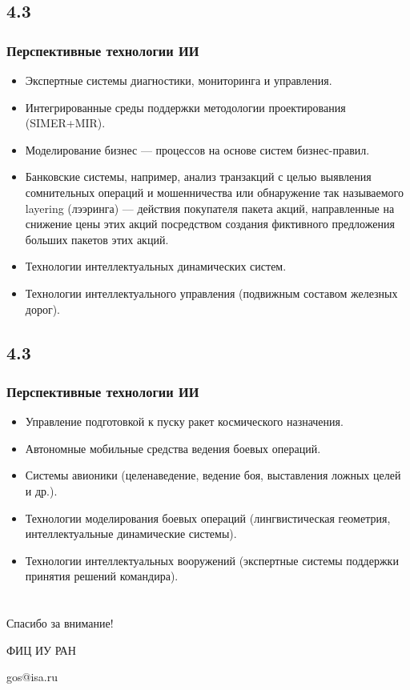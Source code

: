 \documentclass[default]{beamer}
\begin{document}
	\subsection{4.3}
	\begin{frame}
		\frametitle{Перспективные технологии ИИ}
		
		\begin{itemize}
			\item Экспертные системы диагностики, мониторинга и управления.
			\item Интегрированные среды поддержки методологии проектирования (SIMER+MIR).
			\item Моделирование бизнес --- процессов на основе систем бизнес-правил.
			\item Банковские системы, например,  анализ транзакций с целью выявления сомнительных операций и  мошенничества или обнаружение так называемого layering (лээринга) --- действия покупателя пакета акций, направленные на снижение цены этих акций посредством создания фиктивного предложения больших пакетов этих акций.
			\item Технологии интеллектуальных динамических систем.
			\item Технологии интеллектуального управления (подвижным составом железных дорог).
		\end{itemize}
		
	\end{frame}
	
	\subsection{4.3}
	\begin{frame}
		\frametitle{Перспективные технологии ИИ}
		
		\begin{itemize}
			\item Управление подготовкой к пуску ракет космического	назначения.
			\item Автономные мобильные средства ведения боевых операций.
			\item Системы авионики (целенаведение, ведение боя, выставления ложных целей и др.).
			\item Технологии моделирования боевых операций (лингвистическая геометрия, интеллектуальные динамические системы).
			\item Технологии интеллектуальных вооружений (экспертные системы поддержки принятия решений  командира).
		\end{itemize}
		
	\end{frame}
	\section*{}
	{
	\begin{frame}
		\centering
		\Huge
		Спасибо за внимание!
		\normalsize
		\par\bigskip
		\par\bigskip
		ФИЦ ИУ РАН
		
		\par\bigskip
		gos@isa.ru
	\end{frame}			
	}
\end{document}
